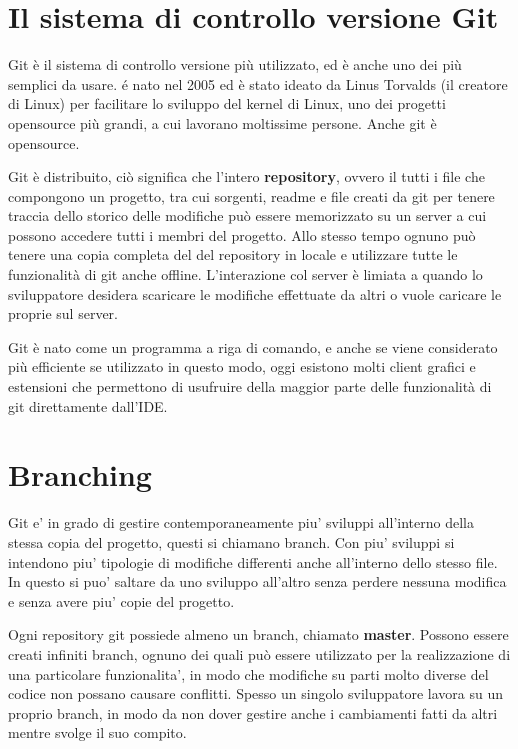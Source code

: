 \documentclass{article} \usepackage[textwidth=18cm,textheight=18cm]{geometry}
\begin{document}
\section{Il sistema di controllo versione Git}

Git è il sistema di controllo versione più utilizzato, ed è anche uno dei più
semplici da usare. é nato nel 2005 ed è stato ideato da Linus Torvalds (il
creatore di Linux) per facilitare lo sviluppo del kernel di Linux, uno dei
progetti opensource più grandi, a cui lavorano moltissime persone. Anche git è
opensource.

Git è distribuito, ciò significa che l'intero \textbf{repository}, ovvero il
tutti i file che compongono un progetto, tra cui sorgenti, readme e file creati
da git per tenere traccia dello storico delle modifiche può essere memorizzato
su un server a cui possono accedere tutti i membri del progetto. Allo stesso
tempo ognuno può tenere una copia completa del del repository in locale e
utilizzare tutte le funzionalità di git anche offline. L'interazione col server
è limiata a quando lo sviluppatore desidera scaricare le modifiche effettuate da
altri o vuole caricare le proprie sul server.

Git è nato come un programma a riga di comando, e anche se viene considerato più
efficiente se utilizzato in questo modo, oggi esistono molti client grafici e
estensioni che permettono di usufruire della maggior parte delle funzionalità di
git direttamente dall'IDE.

\section{Branching}

Git e' in grado di gestire contemporaneamente piu' sviluppi all'interno della
stessa copia del progetto, questi si chiamano branch. Con piu' sviluppi si 
intendono piu' tipologie di modifiche differenti anche all'interno dello stesso file.
In questo si puo' saltare da uno sviluppo all'altro senza perdere nessuna modifica
e senza avere piu' copie del progetto.

Ogni repository git possiede almeno un branch, chiamato \textbf{master}.
Possono essere creati infiniti branch, ognuno dei quali può essere utilizzato
per la realizzazione di una particolare funzionalita', in modo che modifiche su parti
molto diverse del codice non possano causare conflitti. Spesso un singolo
sviluppatore lavora su un proprio branch, in modo da non dover gestire anche i
cambiamenti fatti da altri mentre svolge il suo compito. 
\end{document}

